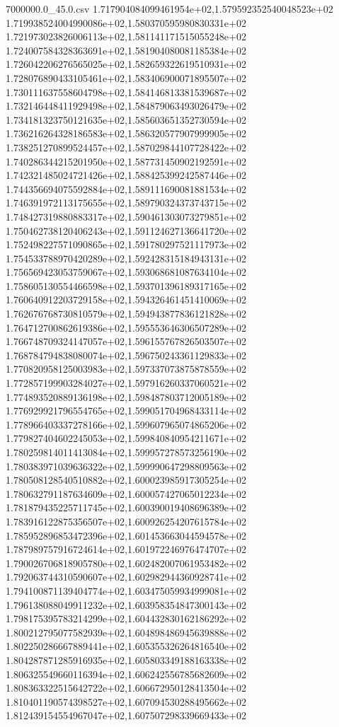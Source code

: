\begin{filecontents*}{7000000.0_45.0.csv}
1.717904084099461954e+02,1.579592352540048523e+02
1.719938524004990086e+02,1.580370595980830331e+02
1.721973023826006113e+02,1.581141171515055248e+02
1.724007584328363691e+02,1.581904080081185384e+02
1.726042206276565025e+02,1.582659322619510931e+02
1.728076890433105461e+02,1.583406900071895507e+02
1.730111637558604798e+02,1.584146813381539687e+02
1.732146448411929498e+02,1.584879063493026479e+02
1.734181323750121635e+02,1.585603651352730594e+02
1.736216264328186583e+02,1.586320577907999905e+02
1.738251270899524457e+02,1.587029844107728422e+02
1.740286344215201950e+02,1.587731450902192591e+02
1.742321485024721426e+02,1.588425399242587446e+02
1.744356694075592884e+02,1.589111690081881534e+02
1.746391972113175655e+02,1.589790324373743715e+02
1.748427319880883317e+02,1.590461303073279851e+02
1.750462738120406243e+02,1.591124627136641720e+02
1.752498227571090865e+02,1.591780297521117973e+02
1.754533788970420289e+02,1.592428315184943131e+02
1.756569423053759067e+02,1.593068681087634104e+02
1.758605130554466598e+02,1.593701396189317165e+02
1.760640912203729158e+02,1.594326461451410069e+02
1.762676768730810579e+02,1.594943877836121828e+02
1.764712700862619386e+02,1.595553646306507289e+02
1.766748709324147057e+02,1.596155767826503507e+02
1.768784794838080074e+02,1.596750243361129833e+02
1.770820958125003983e+02,1.597337073875878559e+02
1.772857199903284027e+02,1.597916260337060521e+02
1.774893520889136198e+02,1.598487803712005189e+02
1.776929921796554765e+02,1.599051704968433114e+02
1.778966403337278166e+02,1.599607965074865206e+02
1.779827404602245053e+02,1.599840840954211671e+02
1.780259814011413084e+02,1.599957278573256190e+02
1.780383971039636322e+02,1.599990647298809563e+02
1.780508128540510882e+02,1.600023985917305254e+02
1.780632791187634609e+02,1.600057427065012234e+02
1.781879435225711745e+02,1.600390019408696389e+02
1.783916122875356507e+02,1.600926254207615784e+02
1.785952896853472396e+02,1.601453663044594578e+02
1.787989757916724614e+02,1.601972246976474707e+02
1.790026706818905780e+02,1.602482007061953482e+02
1.792063744310590607e+02,1.602982944360928741e+02
1.794100871139404774e+02,1.603475059934999081e+02
1.796138088049911232e+02,1.603958354847300143e+02
1.798175395783214299e+02,1.604432830162186292e+02
1.800212795077582939e+02,1.604898486945639888e+02
1.802250286667889441e+02,1.605355326264816540e+02
1.804287871285916935e+02,1.605803349188163338e+02
1.806325549660116394e+02,1.606242556785682609e+02
1.808363322515642722e+02,1.606672950128413504e+02
1.810401190574398527e+02,1.607094530288495662e+02
1.812439154554967047e+02,1.607507298339669433e+02

\end{filecontents*}
